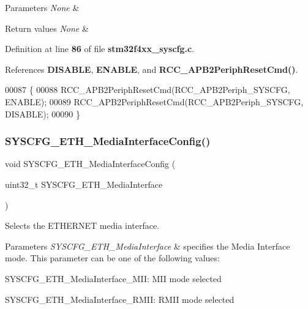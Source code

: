 \begin{DoxyParams}{Parameters}
{\em None} & \\
\hline
\end{DoxyParams}

\begin{DoxyRetVals}{Return values}
{\em None} & \\
\hline
\end{DoxyRetVals}


Definition at line \textbf{ 86} of file \textbf{ stm32f4xx\+\_\+syscfg.\+c}.



References \textbf{ D\+I\+S\+A\+B\+LE}, \textbf{ E\+N\+A\+B\+LE}, and \textbf{ R\+C\+C\+\_\+\+A\+P\+B2\+Periph\+Reset\+Cmd()}.


\begin{DoxyCode}
00087 \{
00088    RCC_APB2PeriphResetCmd(RCC_APB2Periph_SYSCFG, ENABLE);
00089    RCC_APB2PeriphResetCmd(RCC_APB2Periph_SYSCFG, DISABLE);
00090 \}
\end{DoxyCode}
\mbox{\label{group__SYSCFG_gabec494266ebbbde0279ad1d16c3065d0}} 
\subsubsection{S\+Y\+S\+C\+F\+G\+\_\+\+E\+T\+H\+\_\+\+Media\+Interface\+Config()}
{\footnotesize\ttfamily void S\+Y\+S\+C\+F\+G\+\_\+\+E\+T\+H\+\_\+\+Media\+Interface\+Config (\begin{DoxyParamCaption}\item[{uint32\+\_\+t}]{S\+Y\+S\+C\+F\+G\+\_\+\+E\+T\+H\+\_\+\+Media\+Interface }\end{DoxyParamCaption})}



Selects the E\+T\+H\+E\+R\+N\+ET media interface. 


\begin{DoxyParams}{Parameters}
{\em S\+Y\+S\+C\+F\+G\+\_\+\+E\+T\+H\+\_\+\+Media\+Interface} & specifies the Media Interface mode. This parameter can be one of the following values\+: \begin{DoxyItemize}
\item S\+Y\+S\+C\+F\+G\+\_\+\+E\+T\+H\+\_\+\+Media\+Interface\+\_\+\+M\+II\+: M\+II mode selected \item S\+Y\+S\+C\+F\+G\+\_\+\+E\+T\+H\+\_\+\+Media\+Interface\+\_\+\+R\+M\+II\+: R\+M\+II mode selected \end{DoxyItemize}
\\
\hline
\end{DoxyParams}

